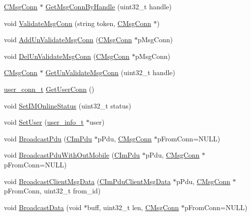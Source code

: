 \begin{DoxyCompactItemize}
\item 
\hyperlink{class_c_msg_conn}{C\+Msg\+Conn} $\ast$ \hyperlink{class_c_im_user_af71ee69a2f845ecf7404be95b64c4bde}{Get\+Msg\+Conn\+By\+Handle} (uint32\+\_\+t handle)
\item 
void \hyperlink{class_c_im_user_a2d55da42d1dd2dc3b6cd83307455fae0}{Validate\+Msg\+Conn} (string token, \hyperlink{class_c_msg_conn}{C\+Msg\+Conn} $\ast$)
\item 
void \hyperlink{class_c_im_user_af7c9a7e98126b4ce3827a36a216ae055}{Add\+Un\+Validate\+Msg\+Conn} (\hyperlink{class_c_msg_conn}{C\+Msg\+Conn} $\ast$p\+Msg\+Conn)
\item 
void \hyperlink{class_c_im_user_ab626d3ad4d97e4a09c6a3ce75308b3f4}{Del\+Un\+Validate\+Msg\+Conn} (\hyperlink{class_c_msg_conn}{C\+Msg\+Conn} $\ast$p\+Msg\+Conn)
\item 
\hyperlink{class_c_msg_conn}{C\+Msg\+Conn} $\ast$ \hyperlink{class_c_im_user_a14bbb7be3fc47012b04e10412e464909}{Get\+Un\+Validate\+Msg\+Conn} (uint32\+\_\+t handle)
\item 
\hyperlink{structuser__conn__t}{user\+\_\+conn\+\_\+t} \hyperlink{class_c_im_user_a54c7efb35a0276d12f6ccb8fcb1eea7e}{Get\+User\+Conn} ()
\item 
void \hyperlink{class_c_im_user_a20015dd460bdae5b60224208ef5195cd}{Set\+I\+M\+Online\+Status} (uint32\+\_\+t status)
\item 
void \hyperlink{class_c_im_user_a6429f2c7728bf25c13739da4b9f19cdf}{Set\+User} (\hyperlink{structuser__info__t}{user\+\_\+info\+\_\+t} $\ast$user)
\item 
void \hyperlink{class_c_im_user_a8adc85a16601f1d300ef0b4b582a3566}{Broadcast\+Pdu} (\hyperlink{class_c_im_pdu}{C\+Im\+Pdu} $\ast$p\+Pdu, \hyperlink{class_c_msg_conn}{C\+Msg\+Conn} $\ast$p\+From\+Conn=N\+U\+L\+L)
\item 
void \hyperlink{class_c_im_user_a00b5ce9b7bc6cd66c756d5a38cbb12a1}{Broadcast\+Pdu\+With\+Out\+Mobile} (\hyperlink{class_c_im_pdu}{C\+Im\+Pdu} $\ast$p\+Pdu, \hyperlink{class_c_msg_conn}{C\+Msg\+Conn} $\ast$p\+From\+Conn=N\+U\+L\+L)
\item 
void \hyperlink{class_c_im_user_ae218ccfce79190fc6988a9250cd12229}{Broadcast\+Client\+Msg\+Data} (\hyperlink{class_c_im_pdu_client_msg_data}{C\+Im\+Pdu\+Client\+Msg\+Data} $\ast$p\+Pdu, \hyperlink{class_c_msg_conn}{C\+Msg\+Conn} $\ast$p\+From\+Conn, uint32\+\_\+t from\+\_\+id)
\item 
void \hyperlink{class_c_im_user_a89e22f8abe6a631d5df428b24fcc61eb}{Broadcast\+Data} (void $\ast$buff, uint32\+\_\+t len, \hyperlink{class_c_msg_conn}{C\+Msg\+Conn} $\ast$p\+From\+Conn=N\+U\+L\+L)

\end{DoxyCompactItemize}
